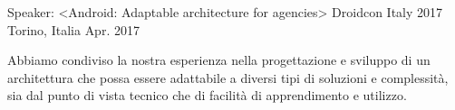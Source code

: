 


\begin{cventries}


\cventry
{Speaker: <Android: Adaptable architecture for agencies>} %
{Droidcon Italy 2017} %
{Torino, Italia} %
{Apr. 2017} %
{ %
	\begin{cvitems}
		\item {Abbiamo condiviso la nostra esperienza nella progettazione e sviluppo di un architettura che possa essere adattabile a diversi tipi di soluzioni e complessità, sia dal punto di vista tecnico che di facilità di apprendimento e utilizzo.}
	\end{cvitems}
}


\end{cventries}